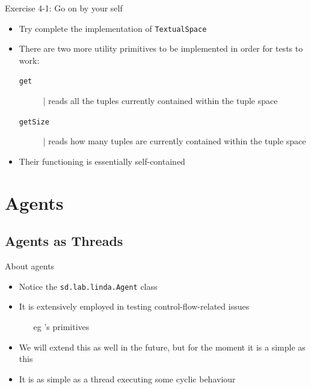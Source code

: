 \documentclass[presentation]{beamer}\mode<presentation>{\usetheme{AMSCesenaPurpleAndGold}}
\begin{document}
\begin{frame}{Exercise 4-1: Go on by your self}
\begin{itemize}
	\item Try complete the implementation of \texttt{TextualSpace}
	
	\vfill
	
	\item There are two more utility primitives to be implemented in order for tests to work:
	\begin{description}
		\item[\texttt{get}] | reads \alert{all} the tuples currently contained within the tuple space 
		\item[\texttt{getSize}] | reads \alert{how many} tuples are currently contained within the tuple space 
	\end{description}

	\vfill
	
	\item Their functioning is essentially self-contained
	
\end{itemize}
\end{frame}

\section{Agents}

\subsection{Agents as Threads}

\begin{frame}{About agents}
\begin{itemize}
	\item Notice the \texttt{sd.lab.linda.\alert{Agent}} class
	
	\vfill
	
	\item It is extensively employed in testing control-flow-related issues
	\begin{itemize}
		\item[eg] \linda{}'s primitives
	\end{itemize}
	
	\vfill
	
	\item We will extend this as well in the future, but for the moment it is a simple as this
	
	\vfill
	
	\item It is as simple as a thread executing some \alert{cyclic} behaviour
	
\end{itemize}
\end{frame}
\end{document}
